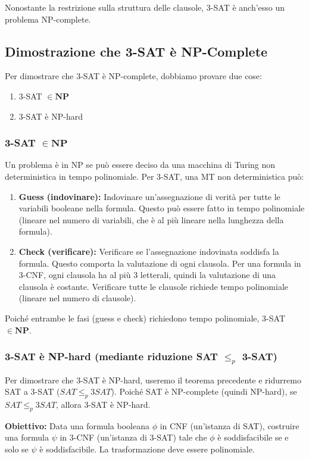 \documentclass[a4paper]{article}
\begin{document}
Nonostante la restrizione sulla struttura delle clausole, 3-SAT è anch'esso un problema NP-complete.

\subsection{Dimostrazione che 3-SAT è NP-Complete}

Per dimostrare che 3-SAT è NP-complete, dobbiamo provare due cose:
\begin{enumerate}
    \item 3-SAT $\in \mathbf{NP}$
    \item 3-SAT è NP-hard
\end{enumerate}

\subsubsection{3-SAT $\in \mathbf{NP}$}
Un problema è in NP se può essere deciso da una macchina di Turing non deterministica in tempo polinomiale.
Per 3-SAT, una MT non deterministica può:
\begin{enumerate}
    \item \textbf{Guess (indovinare):} Indovinare un'assegnazione di verità per tutte le variabili booleane nella formula. Questo può essere fatto in tempo polinomiale (lineare nel numero di variabili, che è al più lineare nella lunghezza della formula).
    \item \textbf{Check (verificare):} Verificare se l'assegnazione indovinata soddisfa la formula. Questo comporta la valutazione di ogni clausola. Per una formula in 3-CNF, ogni clausola ha al più 3 letterali, quindi la valutazione di una clausola è costante. Verificare tutte le clausole richiede tempo polinomiale (lineare nel numero di clausole).
\end{enumerate}
Poiché entrambe le fasi (guess e check) richiedono tempo polinomiale, 3-SAT $\in \mathbf{NP}$.

\subsubsection{3-SAT è NP-hard (mediante riduzione SAT $\le_p$ 3-SAT)}

Per dimostrare che 3-SAT è NP-hard, useremo il teorema precedente e ridurremo SAT a 3-SAT ($SAT \le_p 3SAT$). Poiché SAT è NP-complete (quindi NP-hard), se $SAT \le_p 3SAT$, allora 3-SAT è NP-hard.

\textbf{Obiettivo:} Data una formula booleana $\phi$ in CNF (un'istanza di SAT), costruire una formula $\psi$ in 3-CNF (un'istanza di 3-SAT) tale che $\phi$ è soddisfacibile se e solo se $\psi$ è soddisfacibile. La trasformazione deve essere polinomiale.
\end{document}
